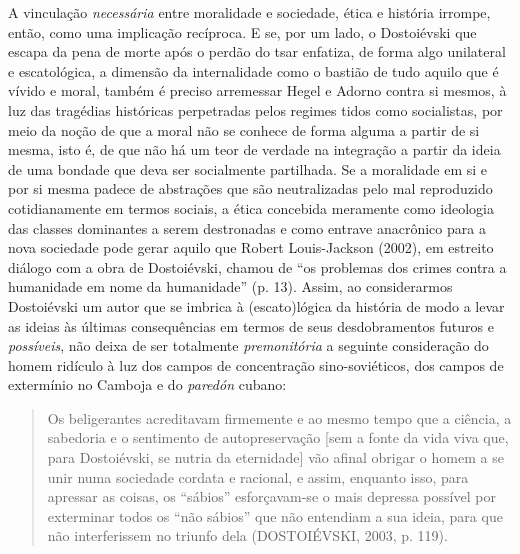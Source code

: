 A vinculação \emph{necessária} entre moralidade e sociedade, ética e
história irrompe, então, como uma implicação recíproca. E se, por um
lado, o Dostoiévski que escapa da pena de morte após o perdão do tsar
enfatiza, de forma algo unilateral e escatológica, a dimensão da
internalidade como o bastião de tudo aquilo que é vívido e moral, também
é preciso arremessar Hegel e Adorno contra si mesmos, à luz das
tragédias históricas perpetradas pelos regimes tidos como socialistas,
por meio da noção de que a moral não se conhece de forma alguma a partir
de si mesma, isto é, de que não há um teor de verdade na integração a
partir da ideia de uma bondade que deva ser socialmente partilhada. Se a
moralidade em si e por si mesma padece de abstrações que são
neutralizadas pelo mal reproduzido cotidianamente em termos sociais, a
ética concebida meramente como ideologia das classes dominantes a serem
destronadas e como entrave anacrônico para a nova sociedade pode gerar
aquilo que Robert Louis-Jackson (2002), em estreito diálogo com a obra
de Dostoiévski, chamou de ``os problemas dos crimes contra a humanidade
em nome da humanidade'' (p. 13). Assim, ao considerarmos Dostoiévski um
autor que se imbrica à (escato)lógica da história de modo a levar as
ideias às últimas consequências em termos de seus desdobramentos futuros
e \emph{possíveis}, não deixa de ser totalmente \emph{premonitória} a
seguinte consideração do homem ridículo à luz dos campos de concentração
sino-soviéticos, dos campos de extermínio no Camboja e do \emph{paredón}
cubano:

\begin{quote}
Os beligerantes acreditavam firmemente e ao mesmo tempo que a ciência, a
sabedoria e o sentimento de autopreservação {[}sem a fonte da vida viva
que, para Dostoiévski, se nutria da eternidade{]} vão afinal obrigar o
homem a se unir numa sociedade cordata e racional, e assim, enquanto
isso, para apressar as coisas, os ``sábios'' esforçavam-se o mais
depressa possível por exterminar todos os ``não sábios'' que não
entendiam a sua ideia, para que não interferissem no triunfo dela
(DOSTOIÉVSKI, 2003, p. 119).
\end{quote}

